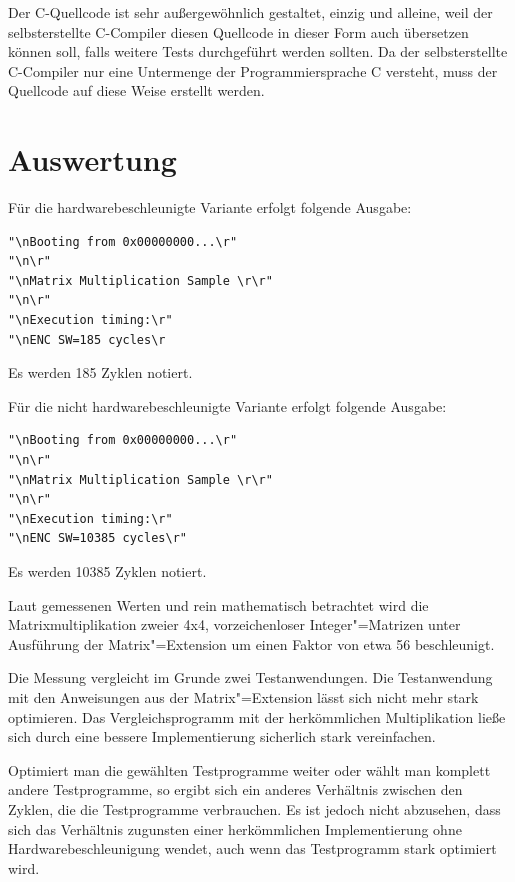 Der C-Quellcode ist sehr außergewöhnlich gestaltet, einzig und alleine, weil der selbsterstellte C-Compiler diesen Quellcode in dieser Form auch übersetzen können soll, falls weitere Tests durchgeführt werden sollten. Da der selbsterstellte C-Compiler nur eine Untermenge der Programmiersprache C versteht, muss der Quellcode auf diese Weise erstellt werden.




\section{Auswertung} \label{sec:results}

Für die hardwarebeschleunigte Variante erfolgt folgende Ausgabe:

\begin{lstlisting}[style=PseudoLang,caption={Ausgabe der Zyklen, beschleunigte Multiplikation},captionpos=b]
"\nBooting from 0x00000000...\r"
"\n\r"
"\nMatrix Multiplication Sample \r\r"
"\n\r"
"\nExecution timing:\r"
"\nENC SW=185 cycles\r
\end{lstlisting}

Es werden 185 Zyklen notiert.

Für die nicht hardwarebeschleunigte Variante erfolgt folgende Ausgabe:

\begin{lstlisting}[style=PseudoLang,caption={Ausgabe der Zyklen, einfache Multiplikation},captionpos=b]
"\nBooting from 0x00000000...\r"
"\n\r"
"\nMatrix Multiplication Sample \r\r"
"\n\r"
"\nExecution timing:\r"
"\nENC SW=10385 cycles\r"
\end{lstlisting}

Es werden 10385 Zyklen notiert.

Laut gemessenen Werten und rein mathematisch betrachtet wird die Matrixmultiplikation zweier 4x4, vorzeichenloser Integer"=Matrizen unter Ausführung der Matrix"=Extension um einen Faktor von etwa 56 beschleunigt.

Die Messung vergleicht im Grunde zwei Testanwendungen. Die Testanwendung mit den Anweisungen aus der Matrix"=Extension lässt sich nicht mehr stark optimieren. Das Vergleichsprogramm mit der herkömmlichen Multiplikation ließe sich durch eine bessere Implementierung sicherlich stark vereinfachen.

Optimiert man die gewählten Testprogramme weiter oder wählt man komplett andere Testprogramme, so ergibt sich ein anderes Verhältnis zwischen den Zyklen, die die Testprogramme verbrauchen. Es ist jedoch nicht abzusehen, dass sich das Verhältnis zugunsten einer herkömmlichen Implementierung ohne Hardwarebeschleunigung wendet, auch wenn das Testprogramm stark optimiert wird.

